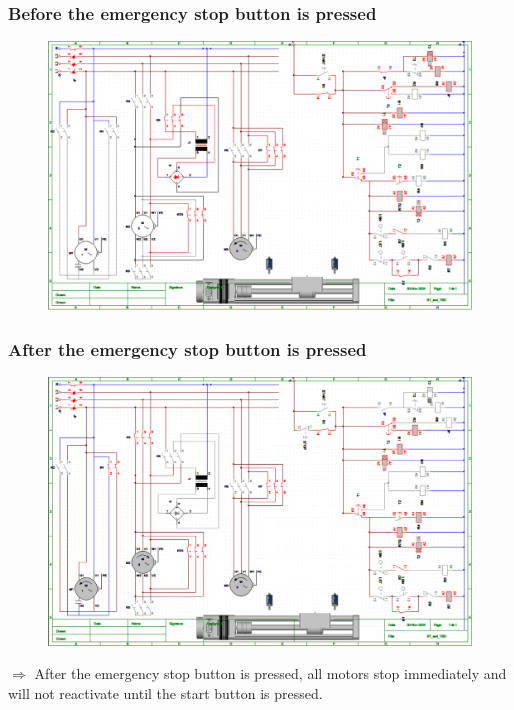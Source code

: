 \subsubsection{Before the emergency stop button is pressed}
\begin{figure}[H]
    \centering
    \includegraphics[width=1\textwidth]{pictures/1d.png}
\end{figure}
\cleardoublepage
\subsubsection{After the emergency stop button is pressed}
\begin{figure}[H]
    \centering
    \includegraphics[width=1\textwidth]{pictures/1e.png}
\end{figure}
$\Rightarrow$ After the emergency stop button is pressed, all motors stop immediately and will not reactivate until the start button is pressed.
\cleardoublepage